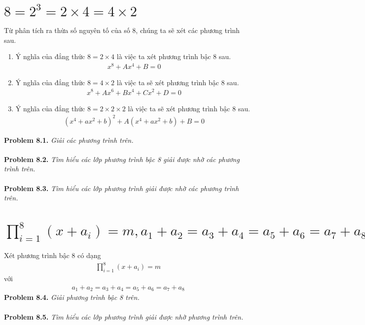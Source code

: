 \documentclass[a4paper,oneside]{book}
\numberwithin{equation}{chapter}
\begin{document}
\section{$8 = {2^3} = 2\times 4 = 4\times 2$}
Từ phân tích ra thừa số nguyên tố của số 8, chúng ta sẽ xét các phương trình sau.
\begin{enumerate}
\item Ý nghĩa của đẳng thức $8= 2\times 4$ là việc ta xét phương trình bậc 8 sau.
\begin{align}
{x^8} + A{x^4} + B = 0
\end{align}
\item Ý nghĩa của đẳng thức $8=4 \times 2$ là việc ta sẽ xét phương trình bậc 8 sau.
\begin{align}
{x^8} + A{x^6} + B{x^4} + C{x^2} + D = 0
\end{align}
\item Ý nghĩa của đẳng thức $8 = 2 \times 2 \times 2$ là việc ta sẽ xét phương trình bậc 8 sau.
\begin{align}
{\left( {{x^4} + a{x^2} + b} \right)^2} + A\left( {{x^4} + a{x^2} + b} \right) + B = 0
\end{align}
\end{enumerate}
\textbf{Problem 8.1.} \textit{Giải các phương trình trên.}\\
\\
\textbf{Problem 8.2.} \textit{Tìm hiểu các lớp phương trình bậc 8 giải được nhờ các phương trình trên.}\\
\\
\textbf{Problem 8.3.} \textit{Tìm hiểu các lớp phương trình giải được nhờ các phương trình trên.}
\section{$\prod\limits_{i = 1}^8 {\left( {x + {a_i}} \right) = m} ,{a_1} + {a_2} = {a_3} + {a_4} ={a_5} + {a_6} = {a_7} + {a_8}$}
Xét phương trình bậc 8 có dạng 
\begin{align}
\prod\limits_{i = 1}^8 {\left( {x + {a_i}} \right) = m} 
\end{align}
với
\begin{align}
{a_1} + {a_2} = {a_3} + {a_4} = {a_5} + {a_6} = {a_7} + {a_8}
\end{align}
\textbf{Problem 8.4.} \textit{Giải phương trình bậc 8 trên.}\\
\\
\textbf{Problem 8.5.} \textit{Tìm hiểu các lớp phương trình giải được nhờ phương trình trên.}\\
\end{document}
